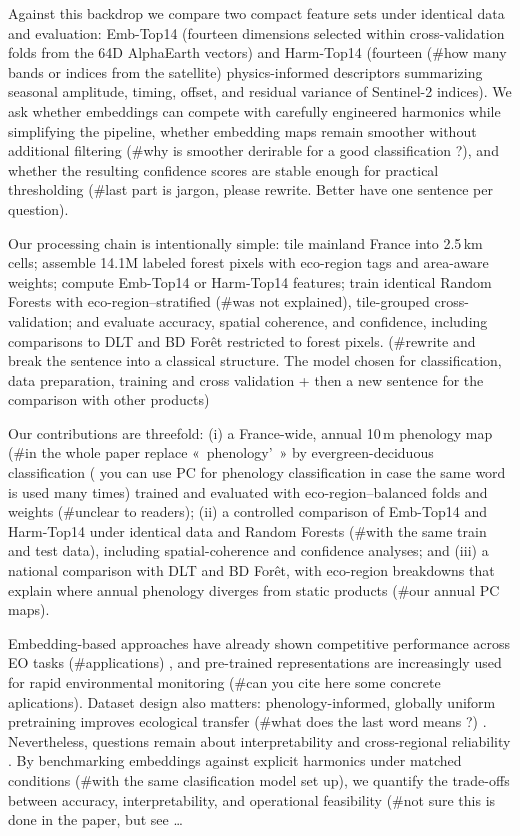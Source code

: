 \documentclass[utf8]{FrontiersinHarvard}
\begin{document}
Against this backdrop we compare two compact feature sets under identical data and evaluation: Emb-Top14 (fourteen dimensions selected within cross-validation folds from the 64D AlphaEarth vectors) and Harm-Top14 (fourteen (#how many bands or indices from the satellite) physics-informed descriptors summarizing seasonal amplitude, timing, offset, and residual variance of Sentinel-2 indices). We ask whether embeddings can compete with carefully engineered harmonics while simplifying the pipeline, whether embedding maps remain smoother without additional filtering (#why is smoother derirable for a good classification ?), and whether the resulting confidence scores are stable enough for practical thresholding (#last part is jargon, please rewrite. Better have one sentence per question).

Our processing chain is intentionally simple: tile mainland France into 2.5\,km cells; assemble 14.1M labeled forest pixels with eco-region tags and area-aware weights; compute Emb-Top14 or Harm-Top14 features; train identical Random Forests with eco-region–stratified (#was not explained), tile-grouped cross-validation; and evaluate accuracy, spatial coherence, and confidence, including comparisons to DLT and BD Forêt restricted to forest pixels. (#rewrite and break the sentence into a classical structure. The model chosen for classification, data preparation, training and cross validation + then a new sentence for the comparison with other products)

Our contributions are threefold: (i) a France-wide, annual 10\,m phenology map (#in the whole paper replace « phenology’ » by evergreen-deciduous classification ( you can use PC for phenology classification in case the same word is used many times) trained and evaluated with eco-region–balanced folds and weights (#unclear to readers); (ii) a controlled comparison of Emb-Top14 and Harm-Top14 under identical data and Random Forests (#with the same train and test data), including spatial-coherence and confidence analyses; and (iii) a national comparison with DLT and BD Forêt, with eco-region breakdowns that explain where annual phenology diverges from static products (#our annual PC maps).

Embedding-based approaches have already shown competitive performance across EO tasks (#applications) \citep{Cong2022,Xie2024FoundationEffective}, and pre-trained representations are increasingly used for rapid environmental monitoring (#can you cite here some concrete aplications)\citep{Szwarcman2024PrithviEO2}. Dataset design also matters: phenology-informed, globally uniform pretraining improves ecological transfer (#what does the last word means ?) \citep{Plekhanova2025SSL4Eco}. Nevertheless, questions remain about interpretability and cross-regional reliability \citep{Xie2024FoundationEffective}. By benchmarking embeddings against explicit harmonics under matched conditions (#with the same clasification model set up), we quantify the trade-offs between accuracy, interpretability, and operational feasibility (#not sure this is done in the paper, but see … 
\end{document}
